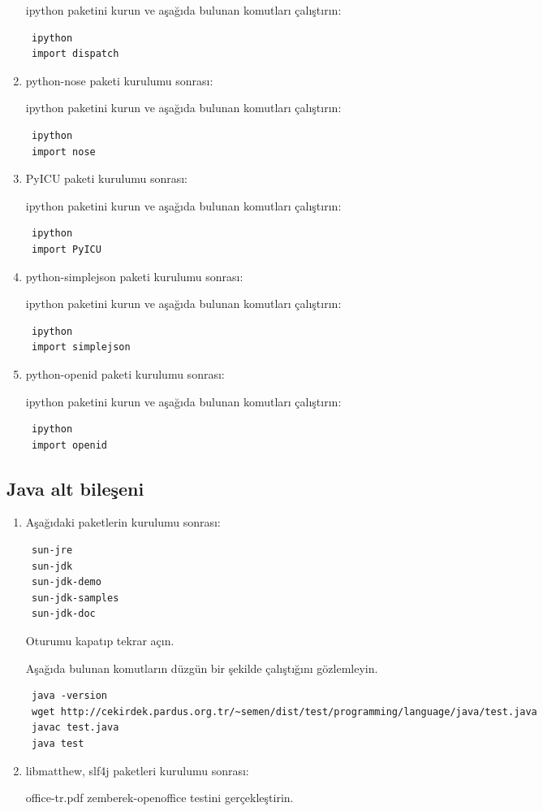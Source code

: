 \documentclass[a4paper,10pt]{article}
\begin{document}
\begin{enumerate}
ipython paketini kurun ve aşağıda bulunan komutları çalıştırın:
\begin{verbatim}
 ipython
 import dispatch
\end{verbatim}

\item python-nose paketi kurulumu sonrası:  

ipython paketini kurun ve aşağıda bulunan komutları çalıştırın:
\begin{verbatim}
 ipython
 import nose
\end{verbatim}

\item PyICU paketi kurulumu sonrası:  

ipython paketini kurun ve aşağıda bulunan komutları çalıştırın:
\begin{verbatim}
 ipython
 import PyICU
\end{verbatim}

\item python-simplejson paketi kurulumu sonrası:  

ipython paketini kurun ve aşağıda bulunan komutları çalıştırın:
\begin{verbatim}
 ipython
 import simplejson
\end{verbatim}
\item python-openid paketi kurulumu sonrası:  

ipython paketini kurun ve aşağıda bulunan komutları çalıştırın:
\begin{verbatim}
 ipython
 import openid
\end{verbatim}


\end{enumerate}

\subsection{Java alt bileşeni}
\begin{enumerate}
 \item Aşağıdaki paketlerin kurulumu sonrası:
\begin{verbatim}
 sun-jre
 sun-jdk
 sun-jdk-demo
 sun-jdk-samples
 sun-jdk-doc
\end{verbatim}

Oturumu kapatıp tekrar açın.

Aşağıda bulunan komutların düzgün bir şekilde çalıştığını gözlemleyin.
\begin{verbatim}
 java -version
 wget http://cekirdek.pardus.org.tr/~semen/dist/test/programming/language/java/test.java
 javac test.java
 java test
\end{verbatim}

\item libmatthew, slf4j paketleri kurulumu sonrası:

office-tr.pdf zemberek-openoffice testini gerçekleştirin.
\end{enumerate}
\end{document}
